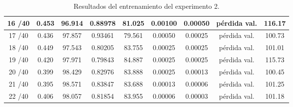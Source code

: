 \begin{table}[H]
\begin{tabular}{|c|c|c|c|c|c|c|c|c|}
         16 /40 & 0.453  & 96.914 & 0.88978 & 81.025 & 0.00100 & 0.00050 & pérdida val. & 116.17 \\ \hline
         17 /40 & 0.436  & 97.857 & 0.93461 & 79.561 & 0.00050 & 0.00025 & pérdida val. & 100.73 \\ \hline
         18 /40 & 0.449  & 97.543 & 0.80205 & 83.755 & 0.00025 & 0.00025 & pérdida val. & 101.01 \\ \hline
         19 /40 & 0.420  & 97.971 & 0.79843 & 84.887 & 0.00025 & 0.00025 & pérdida val. & 115.73 \\ \hline
         20 /40 & 0.399  & 98.429 & 0.82976 & 83.888 & 0.00025 & 0.00013 & pérdida val. & 100.45 \\ \hline
         21 /40 & 0.395  & 98.571 & 0.83847 & 83.688 & 0.00013 & 0.00006 & pérdida val. & 101.25 \\ \hline
         22 /40 & 0.406  & 98.057 & 0.81854 & 83.955 & 0.00006 & 0.00003 & pérdida val. & 101.18 \\ \hline
         \end{tabular}
         \caption{Resultados del entrenamiento del experimento 2.}
         \label{tab:training_results_b2}
         \end{table}